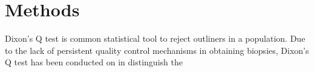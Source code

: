 \chapter{Methods}

Dixon's Q test is common statistical tool to reject outliners in a population. Due to the lack of persistent quality control mechanisms in obtaining biopsies, Dixon's Q test has been conducted on  in distinguish the 